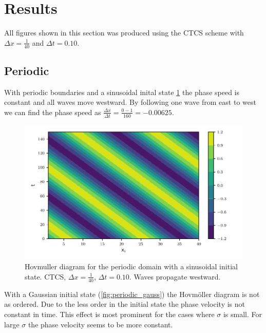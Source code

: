 \newpage
\section{Results}


All figures shown in this section was produced using the CTCS scheme with
$\Delta x = \frac{1}{40} $ and $\Delta t = 0.10$.

\subsection{Periodic}

With periodic boundaries and a sinusoidal inital state \cref{fig:periodic_sine}
the phase speed is constant and all waves move westward. By following one wave
from east to west we can find the phase speed as $\frac{\Delta x}{\Delta t} =
\frac{0-1}{160} = -0.00625$.

\begin{figure}[htp]
  \centering
  \includegraphics[width=\textwidth]{../figures/psi_periodic_centered_short.pdf}
  \caption{Hovmuller diagram for the periodic domain with a sinusoidal initial state. CTCS, $\Delta x = \frac{1}{40}$, $\Delta t = 0.10$. Waves propagate westward.}
  \label{fig:periodic_sine}
\end{figure}

With a Gaussian initial state (\cref{fig:periodic_gauss}) the Hovmöller diagram
is not as ordered. Due to the less order in the initial state the phase velocity
is not constant in time. This effect is most prominent for the cases where
$\sigma$ is small. For large $\sigma$ the phase velocity seems to be more
constant.


